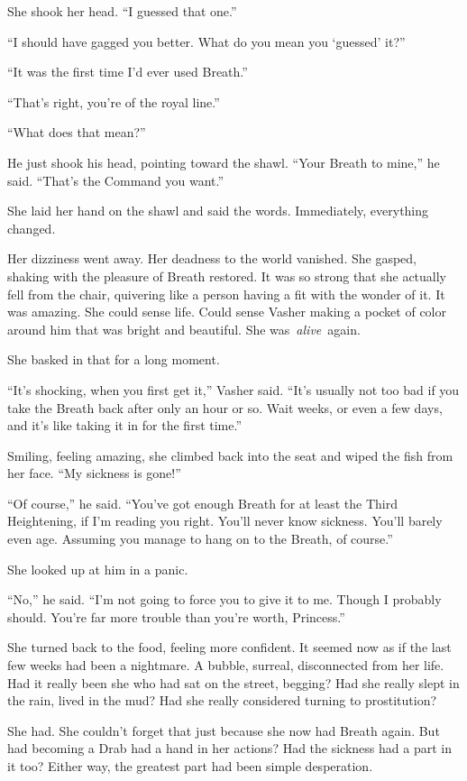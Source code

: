 She shook her head. “I guessed that one.”

“I should have gagged you better. What do you mean you ‘guessed’ it?”

“It was the first time I’d ever used Breath.”

“That’s right, you’re of the royal line.”

“What does that mean?”

He just shook his head, pointing toward the shawl. “Your Breath to mine,” he said. “That’s the Command you want.”

She laid her hand on the shawl and said the words. Immediately, everything changed.

Her dizziness went away. Her deadness to the world vanished. She gasped, shaking with the pleasure of Breath restored. It was so strong that she actually fell from the chair, quivering like a person having a fit with the wonder of it. It was amazing. She could sense life. Could sense Vasher making a pocket of color around him that was bright and beautiful. She was~\textit{alive}~again.

She basked in that for a long moment.

“It’s shocking, when you first get it,” Vasher said. “It’s usually not too bad if you take the Breath back after only an hour or so. Wait weeks, or even a few days, and it’s like taking it in for the first time.”

Smiling, feeling amazing, she climbed back into the seat and wiped the fish from her face. “My sickness is gone!”

“Of course,” he said. “You’ve got enough Breath for at least the Third Heightening, if I’m reading you right. You’ll never know sickness. You’ll barely even age. Assuming you manage to hang on to the Breath, of course.”

She looked up at him in a panic.

“No,” he said. “I’m not going to force you to give it to me. Though I probably should. You’re far more trouble than you’re worth, Princess.”

She turned back to the food, feeling more confident. It seemed now as if the last few weeks had been a nightmare. A bubble, surreal, disconnected from her life. Had it really been she who had sat on the street, begging? Had she really slept in the rain, lived in the mud? Had she really considered turning to prostitution?

She had. She couldn’t forget that just because she now had Breath again. But had becoming a Drab had a hand in her actions? Had the sickness had a part in it too? Either way, the greatest part had been simple desperation.

